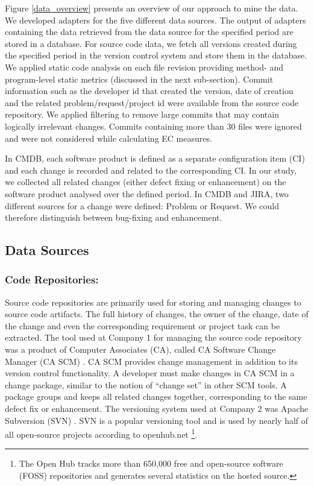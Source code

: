 \documentclass[times]{smrauth}
\begin{document}
Figure \ref{data_overview} presents an overview of our approach to mine the data. We developed adapters for the five different data sources. The output of adapters containing the data retrieved from the data source for the specified period are stored in a database.  For source code data, we fetch all versions created during the specified period in the version control system and store them in the database. We applied static code analysis on each file revision providing method- and program-level static metrics (discussed in the next sub-section). Commit information such as the developer id that created the version, date of creation and the related problem/request/project id were available from the source code repository. We applied filtering to remove large commits that may contain logically irrelevant changes. Commits containing more than 30 files were ignored and were not considered while calculating EC measures.

In CMDB, each software product is defined as a separate configuration item (CI) and each change is recorded and related to the corresponding CI. In our study, we collected all related changes (either  defect fixing or enhancement) on the software product analysed over the defined period. In CMDB and JIRA, two different sources for a change were defined: Problem or Request. We could therefore distinguish between bug-fixing and enhancement.    


\subsection{Data Sources}

\subsubsection{Code Repositories:}
Source code repositories are primarily used for storing and managing changes to source code artifacts. The full history of changes, the owner of the change, date of the change and even the corresponding requirement or project task can be extracted.  The tool used at Company 1 for managing the source code repository was a product of Computer Associates (CA), called CA Software Change Manager (CA SCM) \cite{CASCM:2013:Online}.  CA SCM provides change management in addition to its version control functionality. A developer must make changes in CA SCM in a change package, similar to the notion of ``change set'' in other SCM tools. A package groups and keeps all related changes together, corresponding to the same  defect fix or enhancement. The versioning system used at Company 2 was Apache Subversion (SVN) \cite{SVN:2015:Online}. SVN is a popular versioning tool and is used by nearly half of all open-source projects according to openhub.net \footnote{The Open Hub tracks more than 650,000 free and open-source software (FOSS) repositories and generates several statistics on the hosted source.}.
\end{document}
